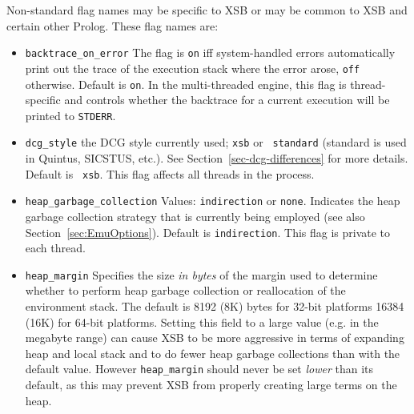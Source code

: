 \begin{description}
Non-standard flag names may be specific to XSB or may be common to XSB
and certain other Prolog.  These flag names are:
\begin{itemize}
%
\item {\tt backtrace\_on\_error} The flag is {\tt on} iff
  system-handled errors automatically print out the trace of the
  execution stack where the error arose, {\tt off} otherwise. Default
  is {\tt on}.  In the multi-threaded engine, this flag is
  thread-specific and controls whether the backtrace for a current
  execution will be printed to {\tt STDERR}.
\item {\tt dcg\_style}  the DCG style currently used; {\tt xsb} or {\tt
  standard} (standard is used in Quintus, SICSTUS, etc.).  See
Section~\ref{sec-dcg-differences} for more details. Default is {\tt
  xsb}. This flag affects all threads in the process.
%
\item {\tt heap\_garbage\_collection} Values: {\tt indirection} or
  {\tt none}.  Indicates the heap garbage collection strategy that is
  currently being employed (see also Section~\ref{sec:EmuOptions}).
  Default is {\tt indirection}.  This flag is private to each thread.
%
\item {\tt heap\_margin} Specifies the size {\em in bytes} of the
  margin used to determine whether to perform heap garbage collection
  or reallocation of the environment stack.  The default is 8192 (8K)
  bytes for 32-bit platforms 16384 (16K) for 64-bit platforms.
  Setting this field to a large value (e.g. in the megabyte range) can
  cause XSB to be more aggressive in terms of expanding heap and local
  stack and to do fewer heap garbage collections than with the default
  value.  However {\tt heap\_margin} should never be set {\em lower}
  than its default, as this may prevent XSB from properly creating
  large terms on the heap.


\end{itemize}
\end{description}
